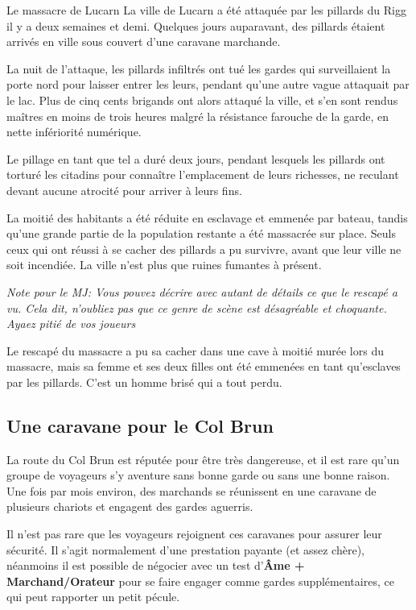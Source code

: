 \documentclass[10pt,twoside,twocolumn,openany,bg=print,justified]{dndbook}
\begin{document}
\begin{commentbox}{Le massacre de Lucarn}
	La ville de Lucarn a été attaquée par les pillards du Rigg il y a deux semaines et demi. Quelques jours auparavant, des pillards étaient arrivés en ville sous couvert d'une caravane marchande. 

	La nuit de l'attaque, les pillards infiltrés ont tué les gardes qui surveillaient la porte nord pour laisser entrer les leurs, pendant qu'une autre vague attaquait par le lac. Plus de cinq cents brigands ont alors attaqué la ville, et s'en sont rendus maîtres en moins de trois heures malgré la résistance farouche de la garde, en nette infériorité numérique.

	Le pillage en tant que tel a duré deux jours, pendant lesquels les pillards ont torturé les citadins pour connaître l'emplacement de leurs richesses, ne reculant devant aucune atrocité pour arriver à leurs fins.

	La moitié des habitants a été réduite en esclavage et emmenée par bateau, tandis qu'une grande partie de la population restante a été massacrée sur place. Seuls ceux qui ont réussi à se cacher des pillards a pu survivre, avant que leur ville ne soit incendiée. La ville n'est plus que ruines fumantes à présent.
\end{commentbox}

\textit{Note pour le MJ: Vous pouvez décrire avec autant de détails ce que le rescapé a vu. Cela dit, n'oubliez pas que ce genre de scène est désagréable et choquante. Ayaez pitié de vos joueurs}

Le rescapé du massacre a pu sa cacher dans une cave à moitié murée lors du massacre, mais sa femme et ses deux filles ont été emmenées en tant qu'esclaves par les pillards. C'est un homme brisé qui a tout perdu.

\subsection*{Une caravane pour le Col Brun}

La route du Col Brun est réputée pour être très dangereuse, et il est rare qu'un groupe de voyageurs s'y aventure sans bonne garde ou sans une bonne raison. Une fois par mois environ, des marchands se réunissent en une caravane de plusieurs chariots et engagent des gardes aguerris.

Il n'est pas rare que les voyageurs rejoignent ces caravanes pour assurer leur sécurité. Il s'agit normalement d'une prestation payante (et assez chère), néanmoins il est possible de négocier avec un test d'\textbf{Âme + Marchand/Orateur} pour se faire engager comme gardes supplémentaires, ce qui peut rapporter un petit pécule.
\end{document}
